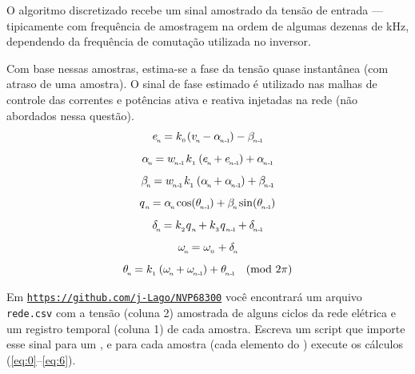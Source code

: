 O algoritmo discretizado recebe um sinal amostrado da tensão de entrada --- tipicamente com frequência de amostragem
na ordem de algumas dezenas de kHz, dependendo da frequência de comutação utilizada no inversor.

Com base nessas amostras, estima-se a fase da tensão quase instantânea (com atraso de uma amostra).
O sinal de fase estimado é utilizado nas malhas de controle das correntes e potências ativa e reativa injetadas na rede
(não abordados nessa questão).
\begin{equation}\label{eq:0}
        e\0 = k_{_0\!} \left( v\0 - \alpha\1 \right)  - \beta\1
\end{equation}
\begin{equation}\label{eq:1}
    \alpha\0 = w\1  \, k_{_1}  \left( e\0 + e\1 \right)  + \alpha\1
\end{equation}
\begin{equation}\label{eq:2}
    \beta\0 = w\1  \, k_{_1}  \left( \alpha\0 + \alpha\1 \right)  + \beta\1
\end{equation}
\begin{equation}\label{eq:3b}
    q{_{_{ n\!}}} =  \alpha\0 \cos(\theta\1) + \beta\0  \sin(\theta\1)
\end{equation}
\begin{equation}\label{eq:4}
    \delta\0 = k_{_2} q{_{_{ n\!}}} + k_{_3} q{_{_{ n\text{-}\!\>\!1\!}}} + \delta\1
\end{equation}
\begin{equation}\label{eq:5}
    \omega_{_{\! n\!}}  = \omega_{_0} + \delta_{_{\! n\!}}
\end{equation}
\begin{equation}\label{eq:6}
    \theta\0 = k_{_1}  \left( \omega\0 + \omega\1 \right)  + \theta\1    \ \ \  (\text{mod}~2\pi)
\end{equation}


Em \texttt{\url{https://github.com/j-Lago/NVP68300}} você encontrará um arquivo \texttt{rede.csv} com a tensão (coluna 2) amostrada de alguns
ciclos da rede elétrica e um registro temporal (coluna 1) de cada amostra.
Escreva um script que importe esse sinal para um , e para cada amostra (cada elemento do )
execute os cálculos (\ref{eq:0}--\ref{eq:6}).

